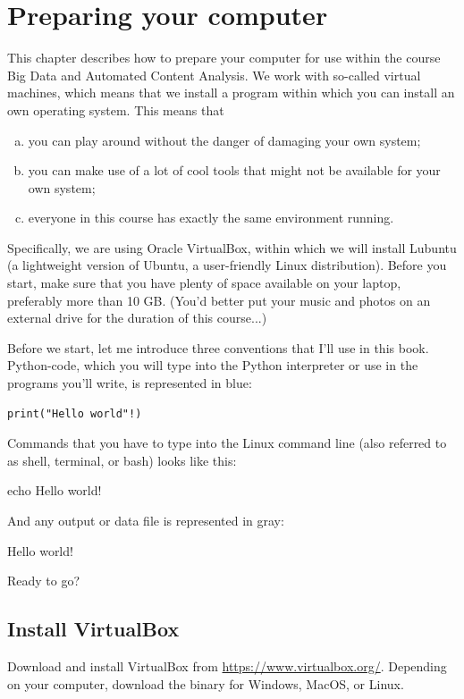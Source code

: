 \documentclass[a4paper,12pt]{book}
\begin{document}
\mainmatter


\chapter{Preparing your computer}
\label{chap:prepare}

This chapter describes how to prepare your computer for use within the course Big Data and Automated Content Analysis. We work with so-called virtual machines, which means that we install a program within which you can install an own operating system. This means that
\begin{enumerate}[(a)] 
\item you can play around without the danger of damaging your own system;
\item you can make use of a lot of cool tools that might not be available for your own system;
\item everyone in this course has exactly the same environment running.
\end{enumerate}

Specifically, we are using Oracle VirtualBox, within which we will install Lubuntu (a lightweight version of Ubuntu, a user-friendly Linux distribution). Before you start, make sure that you have plenty of space available on your laptop, preferably more than 10 GB. (You'd better put your music and photos on an external drive for the duration of this course...)

Before we start, let me introduce three conventions that I'll use in this book. Python-code, which you will type into the Python interpreter or use in the programs you'll write, is represented in blue:
\begin{lstlisting}
print("Hello world"!)
\end{lstlisting}
Commands that you have to type into the Linux command line (also referred to as shell, terminal, or bash) looks like this:
\begin{lstlistingbash}
echo Hello world!
\end{lstlistingbash}
And any output or data file is represented in gray:
\begin{lstlistingoutput}
Hello world!
\end{lstlistingoutput}

Ready to go?



\section{Install VirtualBox}
Download and install VirtualBox from \url{https://www.virtualbox.org/}. Depending on your computer, download the binary for Windows, MacOS, or Linux.
\end{document}
